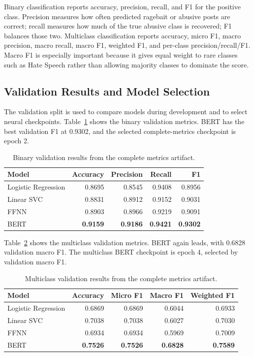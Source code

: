 \documentclass[11pt]{article}
\begin{document}
Binary classification reports accuracy, precision, recall, and F1 for the positive class. Precision measures how often predicted ragebait or abusive posts are correct; recall measures how much of the true abusive class is recovered; F1 balances those two. Multiclass classification reports accuracy, micro F1, macro precision, macro recall, macro F1, weighted F1, and per-class precision/recall/F1. Macro F1 is especially important because it gives equal weight to rare classes such as Hate Speech rather than allowing majority classes to dominate the score.

\subsection{Validation Results and Model Selection}

The validation split is used to compare models during development and to select neural checkpoints. Table~\ref{tab:binary-val} shows the binary validation metrics. BERT has the best validation F1 at 0.9302, and the selected complete-metrics checkpoint is epoch 2.

\begin{table}[H]
\centering
\caption{Binary validation results from the complete metrics artifact.}
\label{tab:binary-val}
\begin{tabular}{lrrrr}
\toprule
Model & Accuracy & Precision & Recall & F1 \\
\midrule
Logistic Regression & 0.8695 & 0.8545 & 0.9408 & 0.8956 \\
Linear SVC & 0.8831 & 0.8912 & 0.9152 & 0.9031 \\
FFNN & 0.8903 & 0.8966 & 0.9219 & 0.9091 \\
BERT & \textbf{0.9159} & \textbf{0.9186} & \textbf{0.9421} & \textbf{0.9302} \\
\bottomrule
\end{tabular}
\end{table}

Table~\ref{tab:multi-val} shows the multiclass validation metrics. BERT again leads, with 0.6828 validation macro F1. The multiclass BERT checkpoint is epoch 4, selected by validation macro F1.

\begin{table}[H]
\centering
\caption{Multiclass validation results from the complete metrics artifact.}
\label{tab:multi-val}
\begin{tabular}{lrrrr}
\toprule
Model & Accuracy & Micro F1 & Macro F1 & Weighted F1 \\
\midrule
Logistic Regression & 0.6869 & 0.6869 & 0.6044 & 0.6933 \\
Linear SVC & 0.7038 & 0.7038 & 0.6027 & 0.7030 \\
FFNN & 0.6934 & 0.6934 & 0.5969 & 0.7009 \\
BERT & \textbf{0.7526} & \textbf{0.7526} & \textbf{0.6828} & \textbf{0.7589} \\
\bottomrule
\end{tabular}
\end{table}
\end{document}
